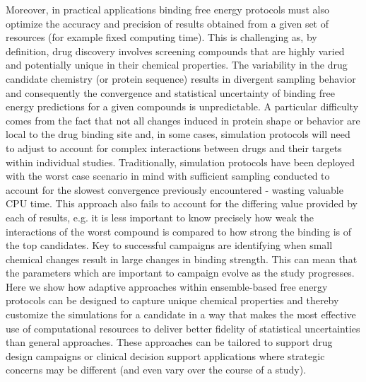 Moreover, in practical applications binding free energy protocols must also 
optimize the accuracy and precision of results obtained from a given set of 
resources (for example fixed computing time). 
This is challenging as, by definition, drug discovery involves screening 
compounds that are highly varied and potentially unique in their chemical 
properties. 
The variability in the drug candidate chemistry (or protein sequence) results 
in divergent sampling  behavior and consequently the convergence and statistical 
uncertainty of binding free energy predictions for a given compounds is 
unpredictable.
A particular difficulty comes from the fact that not all changes induced in 
protein shape or behavior are local to the drug binding site and, in 
some cases, simulation protocols will need to adjust to account for complex 
interactions between drugs and their targets within individual studies.
Traditionally, simulation protocols have been deployed with the worst case 
scenario in mind with sufficient sampling conducted to account for the 
slowest convergence previously encountered - wasting valuable CPU time.
This approach also fails to account for the differing value provided by
each  of results, e.g. it is less important to know precisely how weak 
the interactions of the worst compound is compared to how strong the binding 
is of the top candidates.
Key to successful campaigns are identifying when small chemical changes result in 
large changes in binding strength.
This can mean that the parameters which are important to campaign evolve as the
study progresses.
Here we show how adaptive approaches within ensemble-based free energy 
protocols can be designed to capture unique chemical properties and thereby 
customize the simulations for a candidate in a way that makes the most 
effective use of computational resources to deliver better fidelity of 
statistical uncertainties than general approaches. 
These approaches can be tailored to support drug design campaigns or clinical 
decision support applications where strategic concerns may be different 
(and even vary over the course of a study).

